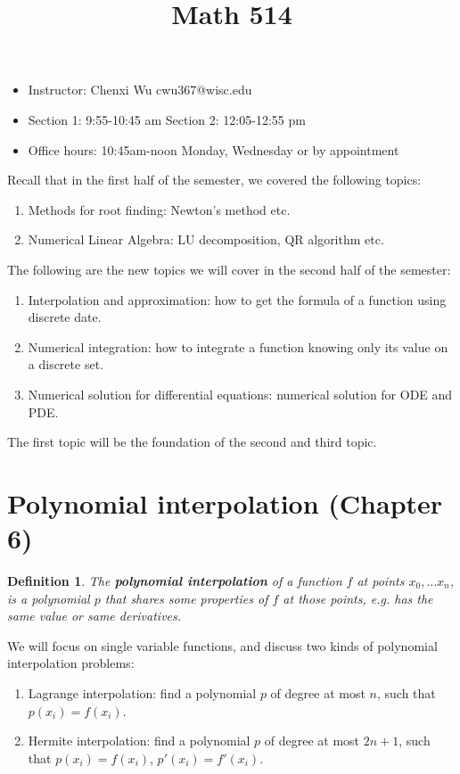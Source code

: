 \documentclass[20pt]{article} %
\title{Math 514}
\theoremstyle{break}
\newtheorem{definition}{Definition}[section]
\begin{document}
\maketitle
  \begin{itemize}
  \item Instructor: Chenxi Wu cwu367@wisc.edu
 \item Section 1: 9:55-10:45 am Section 2: 12:05-12:55 pm  
  \item Office hours: 10:45am-noon Monday, Wednesday or by appointment
  \end{itemize}

  \newpage
  
  Recall that in the first half of the semester, we covered the following topics:
  \begin{enumerate}
  \item Methods for root finding: Newton's method etc.
  \item Numerical Linear Algebra: LU decomposition, QR algorithm etc.
  \end{enumerate}
  
  The following are the new topics we will cover in the second half of the semester:
  \begin{enumerate}
  \item Interpolation and approximation: how to get the formula of a function using discrete date.
  \item Numerical integration: how to integrate a function knowing only its value on a discrete set. 
  \item Numerical solution for differential equations: numerical solution for ODE and PDE.
  \end{enumerate}
  The first topic will be the foundation of the second and third topic.

  \newpage
\tableofcontents

\newpage
  
  \section{Polynomial interpolation (Chapter 6)}
  
  \begin{definition}
   The {\bf polynomial interpolation} of a function $f$ at points $x_0, \dots x_n$, is a polynomial $p$ that shares some properties of $f$ at those points, e.g. has the same value or same derivatives.
  \end{definition}

  We will focus on single variable functions, and discuss two kinds of polynomial interpolation problems:
  \begin{enumerate}
  \item Lagrange interpolation: find a polynomial $p$ of degree at most $n$, such that $p(x_i)=f(x_i)$.
  \item Hermite interpolation: find a polynomial $p$ of degree at most $2n+1$, such that $p(x_i)=f(x_i)$, $p'(x_i)=f'(x_i)$.
  \end{enumerate}
\end{document}
